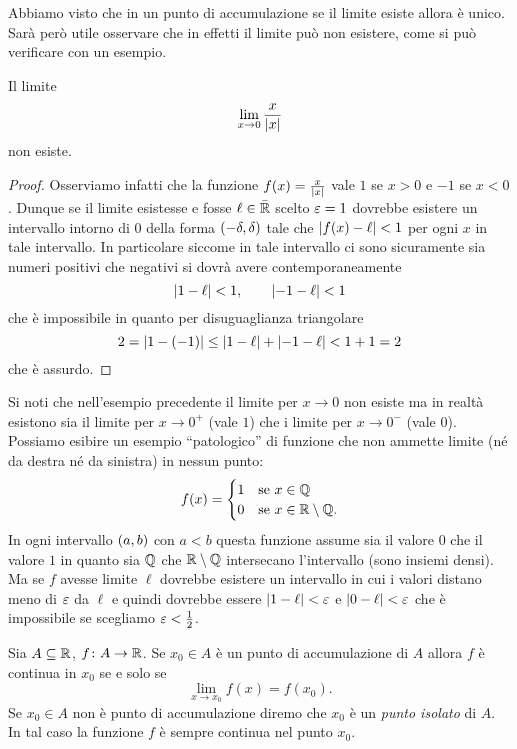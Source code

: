 Abbiamo visto che in un punto di accumulazione se il limite 
esiste allora è unico.
Sarà però utile osservare che in effetti il limite può non 
esistere, come si può verificare con un esempio.

\begin{example}
Il limite 
\[
  \lim_{x\to 0} \frac{x}{{\left|x\right|}}
\]
non esiste. 
\end{example}
\begin{proof}
Osserviamo infatti che la funzione $f(x) = \frac{x}{{\left|x\right|}}$ 
vale $1$ se $x>0$ e $-1$ se $x<0$.
Dunque se il limite esistesse e fosse $\ell\in \bar {{\mathbb R}}$ 
scelto $\varepsilon=1$ dovrebbe esistere un intervallo intorno di $0$ 
della forma $\left(-\delta,\delta\right)$ tale che 
${\left|f(x)-\ell\right|}<1$ per ogni $x$ in tale intervallo.
In particolare siccome in tale intervallo ci sono sicuramente 
sia numeri positivi che negativi si dovrà avere 
contemporaneamente
\[
  {\left|1-\ell\right|}<1, \qquad 
  {\left|-1-\ell\right|}<1  
\]
che è impossibile in quanto per disuguaglianza triangolare 
\[
 2 = {\left|1-(-1)\right|} 
 \le {\left|1-\ell\right|} + {\left|-1-\ell\right|}
 < 1 + 1 = 2
\]
che è assurdo.
\end{proof}

Si noti che nell'esempio precedente il limite per $x\to 0$ 
non esiste ma in realtà esistono sia il limite per $x\to 0^+$ 
(vale $1$) che i limite per $x\to 0^-$ (vale $0$).
Possiamo esibire un esempio ``patologico'' di funzione 
che non ammette limite (né da destra né da sinistra)
in nessun punto:
\[
  f(x) = 
  \begin{cases}
     1 & \text{se $x\in {\mathbb Q}$}\\ 
     0 & \text{se $x\in {\mathbb R}\setminus {\mathbb Q}$}.
  \end{cases}
\]
In ogni intervallo $\left(a,b\right)$ con $a<b$ questa funzione 
assume sia il valore $0$ che il valore $1$ 
in quanto sia ${\mathbb Q}$ che ${\mathbb R}\setminus {\mathbb Q}$ intersecano 
l'intervallo (sono insiemi densi).
Ma se $f$ avesse limite $\ell$ dovrebbe esistere un intervallo 
in cui i valori distano meno di $\varepsilon$ da $\ell$ e quindi 
dovrebbe essere ${\left|1-\ell\right|}<\varepsilon$ e ${\left|0-\ell\right|}<\varepsilon$
che è impossibile se scegliamo $\varepsilon < \frac 1 2$.

\begin{theorem}%
\mymark{***}%
  Sia $A\subseteq {\mathbb R}$, $f\colon A \to {\mathbb R}$. 
  Se $x_0\in A$ è un punto di accumulazione di $A$
  allora $f$ è continua in $x_0$ se e solo se
  \[
    \lim_{x\to x_0}f(x) = f(x_0).
  \]
  Se $x_0\in A$ non è punto di accumulazione diremo 
  che $x_0$ è un \emph{punto isolato}%
%
 di $A$.
  In tal caso la funzione $f$ è sempre continua nel punto $x_0$.
\end{theorem}
  
